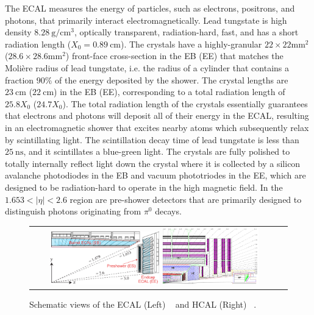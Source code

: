 The ECAL measures the energy of particles, such as electrons, positrons, and photons, that primarily interact electromagnetically.
Lead tungstate is high density $\SI{8.28}{\g\per\cm\cubed}$, optically transparent, radiation-hard, fast, and has a short radiation length ($X_0 = \SI{0.89}{\cm}$).
The crystals have a highly-granular $22 \times 22 \si{\mm\squared}$ ($28.6 \times 28.6 \si{\mm\squared}$) front-face cross-section in the EB (EE) that matches the Molière radius of lead tungstate, i.e. the radius of a cylinder that contains a fraction $90 \%$ of the energy deposited by the shower.
The crystal lengths are $\SI{23}{\cm}$ ($\SI{22}{\cm}$) in the EB (EE), corresponding to a total radiation length of $25.8X_0$ ($24.7X_0$).
The total radiation length of the crystals essentially guarantees that electrons and photons will deposit all of their energy in the ECAL, resulting in an electromagnetic shower that excites nearby atoms which subsequently relax by scintillating light.
The scintillation decay time of lead tungstate is less than $\SI{25}{\ns}$, and it scintillates a blue-green light.
The crystals are fully polished to totally internally reflect light down the crystal where it is collected by a silicon avalanche photodiodes in the EB and vacuum phototriodes in the EE, which are designed to be radiation-hard to operate in the high magnetic field.
In the $1.653 < \vert \eta \vert < 2.6$ region are pre-shower detectors that are primarily designed to distinguish photons originating from $\pi^0$ decays.

\begin{figure}[htb]
  \begin{center}
    \begin{tabular}{cc}
        \includegraphics[width=0.45\textwidth]{fig_LHC_CMS/ECAL.pdf}
        \includegraphics[width=0.40\textwidth]{fig_LHC_CMS/HCAL.png}
    \end{tabular}
    \caption{Schematic views of the ECAL (Left) ~\cite{Bayatian:922757} and HCAL (Right) ~\cite{Chatrchyan:1129810}.
            }
    \label{ECAL_HCAL}
  \end{center}
\end{figure}


